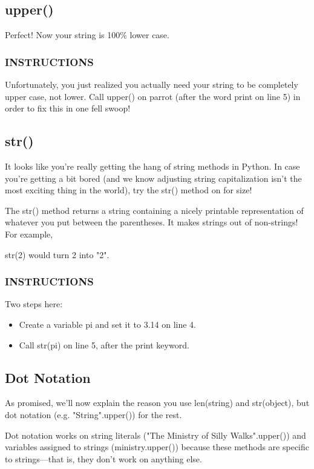 \documentclass[12pt,a4paper,final,twoside,onecolumn,titlepage]{book}
\begin{document}
\subsection{upper()}
Perfect! Now your string is 100\% lower case.

\subsubsection{INSTRUCTIONS}
Unfortunately, you just realized you actually need your string to be completely upper case, not lower. Call upper() on parrot (after the word print on line 5) in order to fix this in one fell swoop!

\subsection{str()}
It looks like you're really getting the hang of string methods in Python. In case you're getting a bit bored (and we know adjusting string capitalization isn't the most exciting thing in the world), try the str() method on for size!

The str() method returns a string containing a nicely printable representation of whatever you put between the parentheses. It makes strings out of non-strings! For example,

str(2)
would turn 2 into "2".

\subsubsection{INSTRUCTIONS}
Two steps here:
\begin{itemize}
\item Create a variable pi and set it to 3.14 on line 4.
\item Call str(pi) on line 5, after the print keyword.
\end{itemize}

\subsection{Dot Notation}
As promised, we'll now explain the reason you use len(string) and str(object), but dot notation (e.g. "String".upper()) for the rest.

Dot notation works on string literals ("The Ministry of Silly Walks".upper()) and variables assigned to strings (ministry.upper()) because these methods are specific to strings—that is, they don't work on anything else.
\end{document}
